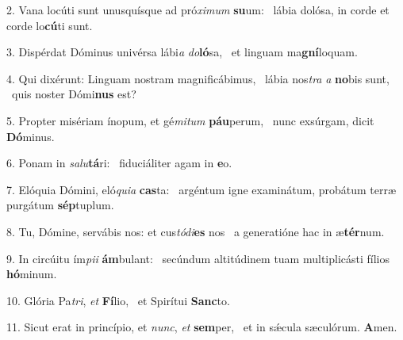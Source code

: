 2. Vana locúti sunt unusquísque ad pró\textit{xi}\textit{mum} \textbf{su}um: \ast\  lábia dolósa, in corde et corde lo\textbf{cú}ti sunt.\

3. Dispérdat Dóminus univérsa lábi\textit{a} \textit{do}\textbf{ló}sa, \ast\  et linguam ma\textbf{gní}loquam.\

4. Qui dixérunt: Linguam nostram magnificábimus, \dag\  lábia nos\textit{tra} \textit{a} \textbf{no}bis sunt, \ast\  quis noster Dómi\textbf{nus} est?\

5. Propter misériam ínopum, et gé\textit{mi}\textit{tum} \textbf{páu}perum, \ast\  nunc exsúrgam, dicit \textbf{Dó}minus.\

6. Ponam in \textit{sa}\textit{lu}\textbf{tá}ri: \ast\  fiduciáliter agam in \textbf{e}o.\

7. Elóquia Dómini, eló\textit{qui}\textit{a} \textbf{cas}ta: \ast\  argéntum igne examinátum, probátum terræ purgátum \textbf{sép}tuplum.\

8. Tu, Dómine, servábis nos: et cus\textit{tó}\textit{di}\textbf{es} nos \ast\  a generatióne hac in æ\textbf{tér}num.\

9. In circúitu ím\textit{pi}\textit{i} \textbf{ám}bulant: \ast\  secúndum altitúdinem tuam multiplicásti fílios \textbf{hó}minum.\

10. Glória Pa\textit{tri}, \textit{et} \textbf{Fí}lio, \ast\  et Spirítui \textbf{Sanc}to.\

11. Sicut erat in princípio, et \textit{nunc}, \textit{et} \textbf{sem}per, \ast\  et in sǽcula sæculórum. \textbf{A}men.\

